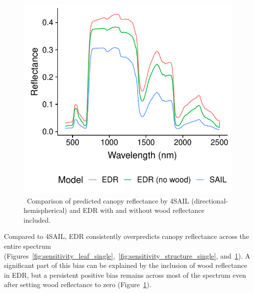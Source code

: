 \begin{figure}
  \centering
  \includegraphics{4_edr/figures/explore_spectra/edr_wood_compare.pdf}
  \caption{\
    Comparison of predicted canopy reflectance by 4SAIL (directional-hemispherical) and EDR with and without wood reflectance included.
  }\label{fig:wood_compare}
\end{figure}

Compared to 4SAIL, EDR consistently overpredicts canopy reflectance across the entire spectrum (Figures~\ref{fig:sensitivity_leaf_single},~\ref{fig:sensitivity_structure_single}, and~\ref{fig:wood_compare}).
A significant part of this bias can be explained by the inclusion of wood reflectance in EDR, but a persistent positive bias remains across most of the spectrum even after setting wood reflectance to zero (Figure~\ref{fig:wood_compare}).

